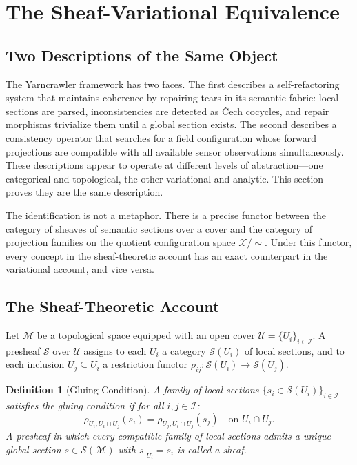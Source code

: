 \documentclass[11pt, oneside]{article}
\newtheorem{definition}[theorem]{Definition}
\newcommand{\Xmod}{\mathcal{X}/{\sim}}
\begin{document}
\section{The Sheaf-Variational Equivalence}
\label{sec:equivalence}

\subsection{Two Descriptions of the Same Object}

The Yarncrawler framework has two faces. The first describes a self-refactoring system
that maintains coherence by repairing tears in its semantic fabric: local sections are
parsed, inconsistencies are detected as \v{C}ech cocycles, and repair morphisms trivialize
them until a global section exists. The second describes a consistency operator that
searches for a field configuration whose forward projections are compatible with all
available sensor observations simultaneously. These descriptions appear to operate at
different levels of abstraction---one categorical and topological, the other variational
and analytic. This section proves they are the same description.

The identification is not a metaphor. There is a precise functor between the category of
sheaves of semantic sections over a cover and the category of projection families on the
quotient configuration space $\Xmod$. Under this functor, every concept in the
sheaf-theoretic account has an exact counterpart in the variational account, and vice
versa.

\subsection{The Sheaf-Theoretic Account}

Let $\mathcal{M}$ be a topological space equipped with an open cover
$\mathcal{U} = \{U_i\}_{i \in \mathcal{I}}$. A presheaf $\mathcal{S}$ over $\mathcal{U}$
assigns to each $U_i$ a category $\mathcal{S}(U_i)$ of local sections, and to each
inclusion $U_j \subseteq U_i$ a restriction functor
$\rho_{ij} : \mathcal{S}(U_i) \to \mathcal{S}(U_j)$.

\begin{definition}[Gluing Condition]
A family of local sections $\{s_i \in \mathcal{S}(U_i)\}_{i \in \mathcal{I}}$ satisfies
the \emph{gluing condition} if for all $i, j \in \mathcal{I}$:
\[
\rho_{U_i, U_i \cap U_j}(s_i) = \rho_{U_j, U_i \cap U_j}(s_j) \quad \text{on }
U_i \cap U_j.
\]
A presheaf in which every compatible family of local sections admits a unique global
section $s \in \mathcal{S}(\mathcal{M})$ with $s|_{U_i} = s_i$ is called a \emph{sheaf}.
\end{definition}
\end{document}
